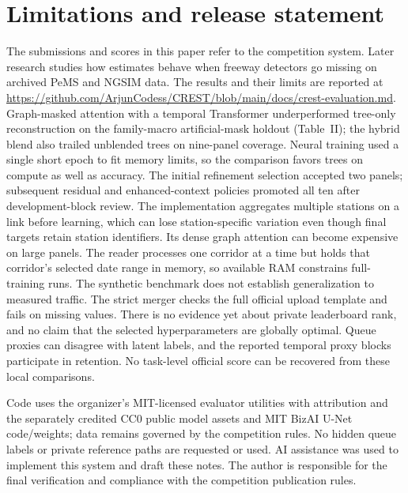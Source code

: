 \documentclass[conference]{IEEEtran}
\begin{document}
\section{Limitations and release statement}
The submissions and scores in this paper refer to the competition system. Later research
studies how estimates behave when freeway detectors go missing on archived PeMS and
NGSIM data. The results and their limits are reported at
\url{https://github.com/ArjunCodess/CREST/blob/main/docs/crest-evaluation.md}.
Graph-masked attention with a temporal Transformer underperformed tree-only
reconstruction on the family-macro artificial-mask holdout (Table~II); the hybrid
blend also trailed unblended trees on nine-panel coverage. Neural training used
a single short epoch to fit memory limits, so the comparison favors trees on
compute as well as accuracy. The initial refinement selection accepted two panels; subsequent residual and enhanced-context policies promoted all ten after development-block review.
The implementation aggregates multiple stations on a link before learning,
which can lose station-specific variation even though final targets retain
station identifiers. Its dense graph attention can become expensive on large
panels. The reader processes one corridor at a time but holds that corridor's
selected date range in memory, so available RAM constrains full-training runs.
The synthetic benchmark does not establish generalization to measured traffic.
The strict merger checks the full official upload template and fails on missing values. There is no evidence yet about private leaderboard rank, and no claim that the selected hyperparameters are globally optimal. Queue proxies can disagree with latent labels, and the reported temporal proxy blocks participate in retention. No task-level official score can be recovered from these local comparisons.

Code uses the organizer's MIT-licensed evaluator utilities with attribution and the separately credited CC0 public model assets and MIT BizAI U-Net code/weights;
data remains governed by the competition rules. No hidden queue labels or private reference paths are requested or used.
AI assistance was used to implement this system and draft these notes. The author is responsible for the final verification and compliance with the competition publication rules.



\end{document}
